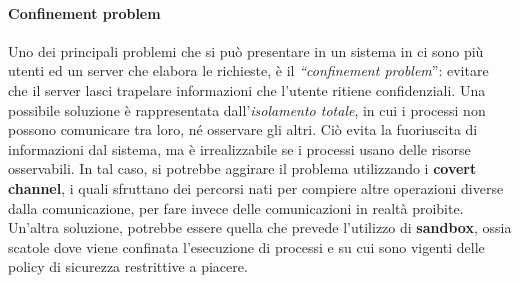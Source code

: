 \paragraph{Confinement problem}
Uno dei principali problemi che si può presentare in un sistema in ci sono più
utenti ed un server che elabora le richieste, è il \textit{``confinement problem}'':
evitare che il server lasci trapelare informazioni che l'utente ritiene
confidenziali.
Una possibile soluzione è rappresentata dall'\textit{isolamento totale},
in cui i processi non possono comunicare tra loro, né osservare gli altri.
Ciò evita la fuoriuscita di informazioni dal sistema, ma è
irrealizzabile se i processi usano delle risorse osservabili. In tal caso,
si potrebbe aggirare il
problema utilizzando i \textbf{covert channel}, i quali sfruttano dei percorsi
nati per compiere altre operazioni diverse dalla comunicazione, per fare invece
delle comunicazioni in realtà proibite. Un'altra
soluzione, potrebbe essere quella che prevede l'utilizzo di \textbf{sandbox},
ossia scatole dove viene confinata l'esecuzione di processi e su cui sono
vigenti delle policy di sicurezza restrittive a piacere.
